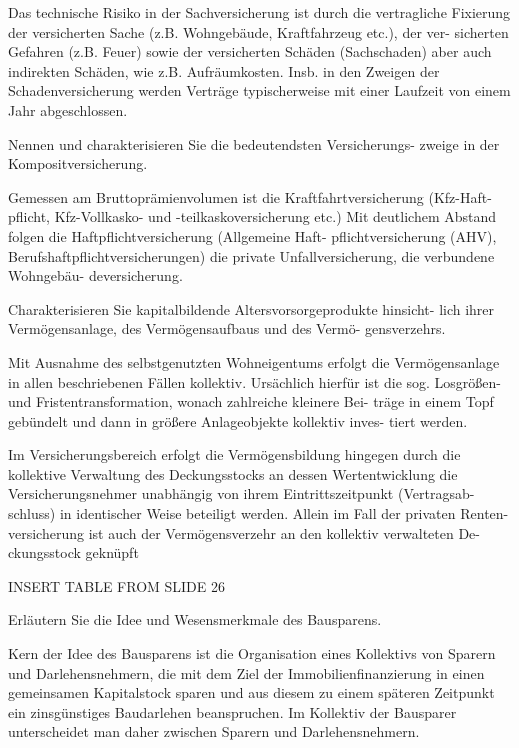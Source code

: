 Das technische Risiko in der Sachversicherung ist durch die vertragliche Fixierung
der versicherten Sache (z.B. Wohngebäude, Kraftfahrzeug etc.), der ver-
sicherten Gefahren (z.B. Feuer) sowie der versicherten Schäden (Sachschaden)
aber auch indirekten Schäden, wie z.B. Aufräumkosten.
Insb. in den Zweigen der Schadenversicherung werden Verträge typischerweise
mit einer Laufzeit von einem Jahr abgeschlossen.



Nennen und charakterisieren Sie die bedeutendsten Versicherungs-
zweige in der Kompositversicherung.

Gemessen am Bruttoprämienvolumen ist die Kraftfahrtversicherung (Kfz-Haft-
pflicht, Kfz-Vollkasko- und -teilkaskoversicherung etc.)
Mit deutlichem Abstand folgen die Haftpflichtversicherung (Allgemeine Haft-
pflichtversicherung (AHV), Berufshaftpflichtversicherungen)
die private Unfallversicherung, die verbundene Wohngebäu-
deversicherung.


Charakterisieren Sie kapitalbildende Altersvorsorgeprodukte hinsicht-
lich ihrer Vermögensanlage, des Vermögensaufbaus und des Vermö-
gensverzehrs.


Mit Ausnahme des selbstgenutzten Wohneigentums erfolgt die
Vermögensanlage in allen beschriebenen Fällen kollektiv. Ursächlich hierfür ist die
sog. Losgrößen- und Fristentransformation, wonach zahlreiche kleinere Bei-
träge in einem Topf gebündelt und dann in größere Anlageobjekte kollektiv inves-
tiert werden.

Im Versicherungsbereich erfolgt die Vermögensbildung hingegen
durch die kollektive Verwaltung des Deckungsstocks an dessen Wertentwicklung
die Versicherungsnehmer unabhängig von ihrem Eintrittszeitpunkt (Vertragsab-
schluss) in identischer Weise beteiligt werden. Allein im Fall der privaten Renten-
versicherung ist auch der Vermögensverzehr an den kollektiv verwalteten De-
ckungsstock geknüpft

INSERT TABLE FROM SLIDE 26



Erläutern Sie die Idee und Wesensmerkmale des Bausparens.

Kern der Idee des Bausparens ist die Organisation eines Kollektivs von Sparern
und Darlehensnehmern, die mit dem Ziel der Immobilienfinanzierung in einen gemeinsamen Kapitalstock sparen 
und aus diesem zu einem späteren Zeitpunkt ein zinsgünstiges Baudarlehen beanspruchen. 
Im Kollektiv der Bausparer unterscheidet man daher zwischen Sparern und Darlehensnehmern.

